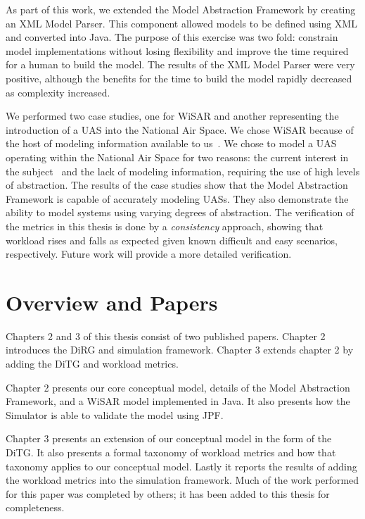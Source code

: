 As part of this work, we extended the Model Abstraction Framework by creating an XML Model Parser.  This component allowed models to be defined using XML and converted into Java.  The purpose of this exercise was two fold: constrain model implementations without losing flexibility and improve the time required for a human to build the model.  The results of the XML Model Parser were very positive, although the benefits for the time to build the model rapidly decreased as complexity increased.

We performed two case studies, one for WiSAR and another representing the introduction of a UAS into the National Air Space.  We chose WiSAR because of the host of modeling information available to us~\cite{adams2009cognitive}.  We chose to model a UAS operating within the National Air Space for two reasons: the current interest in the subject~\cite{nasroadmap} and the lack of modeling information, requiring the use of high levels of abstraction.  The results of the case studies show that the Model Abstraction Framework is capable of accurately modeling UASs.  They also demonstrate the ability to model systems using varying degrees of abstraction.  The verification of the metrics in this thesis is done by a {\em consistency} approach, showing that workload rises and falls as expected given known difficult and easy scenarios, respectively.  Future work will provide a more detailed verification.


\section{Overview and Papers}

Chapters 2 and 3 of this thesis consist of two published papers.  Chapter 2 introduces the DiRG and simulation framework.  Chapter 3 extends chapter 2 by adding the DiTG and workload metrics.

Chapter 2 presents our core conceptual model, details of the Model Abstraction Framework, and a WiSAR model implemented in Java.  It also presents how the Simulator is able to validate the model using JPF.

Chapter 3 presents an extension of our conceptual model in the form of the DiTG.  It also presents a formal taxonomy of workload metrics and how that taxonomy applies to our conceptual model.  Lastly it reports the results of adding the workload metrics into the simulation framework.  Much of the work performed for this paper was completed by others; it has been added to this thesis for completeness.

